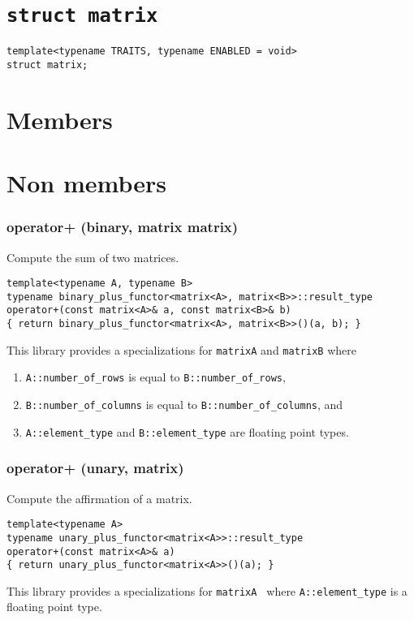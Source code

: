 \documentclass[oneside]{book}
\begin{document}
\section{\texttt{struct matrix}}
\begin{verbatim}
template<typename TRAITS, typename ENABLED = void>
struct matrix;
\end{verbatim}

\section{Members}

\section{Non members}
\subsubsection{operator+ (binary, matrix matrix)}
Compute the sum of two matrices.
\begin{verbatim}
template<typename A, typename B>
typename binary_plus_functor<matrix<A>, matrix<B>>::result_type
operator+(const matrix<A>& a, const matrix<B>& b)
{ return binary_plus_functor<matrix<A>, matrix<B>>()(a, b); }
\end{verbatim}
This library provides a specializations for \texttt{matrix\textlangle A\textrangle}
and \texttt{matrix\textlangle B\textrangle} where
\begin{enumerate}
	\item \texttt{A::number\_of\_rows} is equal to \texttt{B::number\_of\_rows},
    \item \texttt{B::number\_of\_columns} is equal to \texttt{B::number\_of\_columns}, and
	\item \texttt{A::element\_type} and \texttt{B::element\_type} are floating point types.
\end{enumerate}

\subsubsection{operator+ (unary, matrix)}
Compute the affirmation of a matrix.
\begin{verbatim}
template<typename A>
typename unary_plus_functor<matrix<A>>::result_type
operator+(const matrix<A>& a)
{ return unary_plus_functor<matrix<A>>()(a); }
\end{verbatim}
This library provides a specializations for \texttt{matrix\textlangle A
\textrangle} where  \texttt{A::element\_type} is a floating point type.
\end{document}
